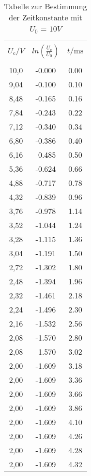 \begin{table}[H]
  \centering
  \caption{Tabelle zur Bestimmung der Zeitkonstante mit $U_\text{0}$ = $10V$}
    \begin{tabular}{c c c }
      \toprule \\
      $U_\text{c} / V$& $ln(\frac{U_\text{c}}{U_\text{0}})$ & $t /\si{\milli\second}$ \\
      \midrule \\
      10,0& -0.000 & 0.00 \\
      9,04& -0.100 & 0.10 \\
      8,48& -0.165 & 0.16 \\
      7,84& -0.243 & 0.22 \\
      7,12& -0.340 & 0.34 \\
      6,80& -0.386 & 0.40 \\
      6,16& -0.485 & 0.50 \\
      5,36& -0.624 & 0.66 \\
      4,88& -0.717 & 0.78 \\
      4,32& -0.839 & 0.96 \\
      3,76& -0.978 & 1.14 \\
      3,52& -1.044 & 1.24 \\
      3,28& -1.115 & 1.36 \\
      3,04& -1.191 & 1.50 \\
      2,72& -1.302 & 1.80 \\
      2,48& -1.394 & 1.96 \\
      2,32& -1.461 & 2.18 \\
      2,24& -1.496 & 2.30 \\
      2,16& -1.532 & 2.56 \\
      2,08& -1.570 & 2.80 \\
      2,08& -1.570 & 3.02 \\
      2,00& -1.609 & 3.18 \\
      2,00& -1.609 & 3.36 \\
      2,00& -1.609 & 3.66 \\
      2,00& -1.609 & 3.86 \\
      2,00& -1.609 & 4.10 \\
      2,00& -1.609 & 4.26 \\
      2,00& -1.609 & 4.28 \\
      2,00& -1.609 & 4.32 \\
      \bottomrule
    \end{tabular}
    \label{tab:1}
  \end{table}
